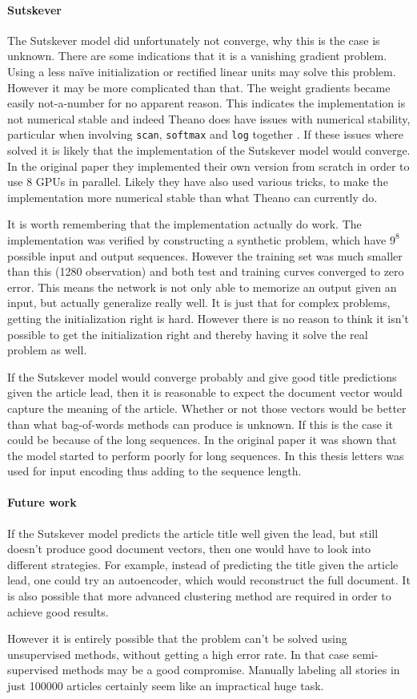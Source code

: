 \paragraph{Sutskever} The Sutskever model did unfortunately not converge, why this is the case is unknown. There are some indications that it is a vanishing gradient problem. Using a less naïve initialization or rectified linear units may solve this problem. However it may be more complicated than that. The weight gradients became easily not-a-number for no apparent reason. This indicates the implementation is not numerical stable and indeed Theano does have issues with numerical stability, particular when involving \texttt{scan}, \texttt{softmax} and \texttt{log} together \cite{theano-issue}. If these issues where solved it is likely that the implementation of the Sutskever model would converge. In the original paper \cite{sutskever} they implemented their own version from scratch in order to use 8 GPUs in parallel. Likely they have also used various tricks, to make the implementation more numerical stable than what Theano can currently do.

It is worth remembering that the implementation actually do work. The implementation was verified by constructing a synthetic problem, which have $9^8$ possible input and output sequences. However the training set was much smaller than this (1280 observation) and both test and training curves converged to zero error. This means the network is not only able to memorize an output given an input, but actually generalize really well. It is just that for complex problems, getting the initialization right is hard. However there is no reason to think it isn't possible to get the initialization right and thereby having it solve the real problem as well.

If the Sutskever model would converge probably and give good title predictions given the article lead, then it is reasonable to expect the document vector would capture the meaning of the article. Whether or not those vectors would be better than what bag-of-words methods can produce is unknown. If this is the case it could be because of the long sequences. In the original paper \cite{sutskever} it was shown that the model started to perform poorly for long sequences. In this thesis letters was used for input encoding thus adding to the sequence length.

\paragraph{Future work} If the Sutskever model predicts the article title well given the lead, but still doesn't produce good document vectors, then one would have to look into different strategies. For example, instead of predicting the title given the article lead, one could try an autoencoder, which would reconstruct the full document. It is also possible that more advanced clustering method are required in order to achieve good results.

However it is entirely possible that the problem can't be solved using unsupervised methods, without getting a high error rate. In that case semi-supervised methods may be a good compromise. Manually labeling all stories in just 100000 articles certainly seem like an impractical huge task.
 